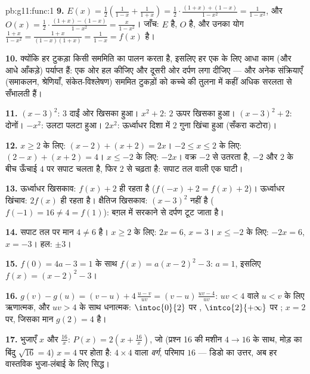 \begin{solution}{pb:g11:func:1}
\textbf{9.} $E(x) = \frac12\left(\frac{1}{1 - x} + \frac{1}{1 +
x}\right) = \frac12 \cdot \frac{(1 + x) + (1 - x)}{1 - x^2}
= \frac{1}{1 - x^2}$, और $O(x) = \frac12 \cdot \frac{(1 + x) - (1 - x)}{1 - x^2}
= \frac{x}{1 - x^2}$। जाँच: $E$  है, $O$  है, और उनका योग
$\frac{1 + x}{1 - x^2} =
\frac{1 + x}{(1 - x)(1 + x)} = \frac{1}{1 - x} = f(x)$ है।

\textbf{10.} क्योंकि हर टुकड़ा किसी सममिति का पालन करता है, इसलिए हर एक के
लिए आधा काम (और आधे आँकड़े) पर्याप्त हैं: एक ओर हल कीजिए और दूसरी ओर दर्पण
लगा दीजिए --- और अनेक संक्रियाएँ (समाकलन, श्रेणियाँ, संकेत-विश्लेषण) सममित
टुकड़ों को कच्चे  की तुलना में कहीं अधिक सरलता से सँभालती हैं।

\textbf{11.} $(x-3)^2$: $3$ दाईं ओर खिसका हुआ। $x^2 + 2$: $2$ ऊपर खिसका हुआ।
$(x-3)^2 + 2$: दोनों। $-x^2$: उलटा पलटा हुआ। $2x^2$: ऊर्ध्वाधर दिशा में $2$ गुना
खिंचा हुआ (सँकरा कटोरा)।

\textbf{12.} $x \geq 2$ के लिए: $(x - 2) + (x + 2) = 2x$। $-2 \leq x \leq 2$ के लिए: $(2 - x) + (x + 2) = 4$। $x \leq -2$ के लिए: $-2x$।
वक्र  $-2$ से उतरता है, $-2$ और $2$ के बीच ऊँचाई $4$ पर सपाट
चलता है, फिर  $2$ से चढ़ता है: सपाट तल वाली एक घाटी।

\textbf{13.} ऊर्ध्वाधर खिसकाव: $f(x) + 2$  ही रहता है ($f(-x) + 2 = f(x) + 2$)। ऊर्ध्वाधर
खिंचाव: $2f(x)$  ही रहता है। क्षैतिज खिसकाव: $(x - 3)^2$  नहीं है ($f(-1) = 16 \neq 4 = f(1)$):
बग़ल में सरकाने से दर्पण टूट जाता है।

\textbf{14.} सपाट तल पर मान $4 \neq 6$ है। $x \geq 2$ के लिए: $2x = 6$, $x = 3$। $x \leq -2$ के
लिए: $-2x = 6$, $x = -3$। हल: $\pm 3$।

\textbf{15.} $f(0) = 4a - 3 = 1$ के साथ $f(x) = a(x - 2)^2 - 3$: $a = 1$, इसलिए $f(x) = (x - 2)^2 - 3$।

\textbf{16.} $g(v) - g(u) = (v - u) + 4\,\frac{u - v}{uv}
= (v - u)\,\frac{uv - 4}{uv}$: $uv < 4$ वाले $u < v$ के लिए ऋणात्मक, और $uv > 4$ के साथ
धनात्मक: $\intoc{0}{2}$ पर , $\intco{2}{+\infty}$ पर ;  $x = 2$ पर, जिसका मान
$g(2) = 4$ है।

\textbf{17.} भुजाएँ $x$ और $\frac{16}{x}$: $P(x) = 2\left(x + \frac{16}{x}\right)$, जो (प्रश्न 16 की मशीन $4 \to 16$ के
साथ, मोड़ का बिंदु $\sqrt{16} = 4$) $x = 4$ पर  होता है: $4 \times 4$ वाला \emph{वर्ग},
परिमाप $16$ --- डिडो का उत्तर, अब हर वास्तविक भुजा-लंबाई के लिए सिद्ध।


\end{solution}

